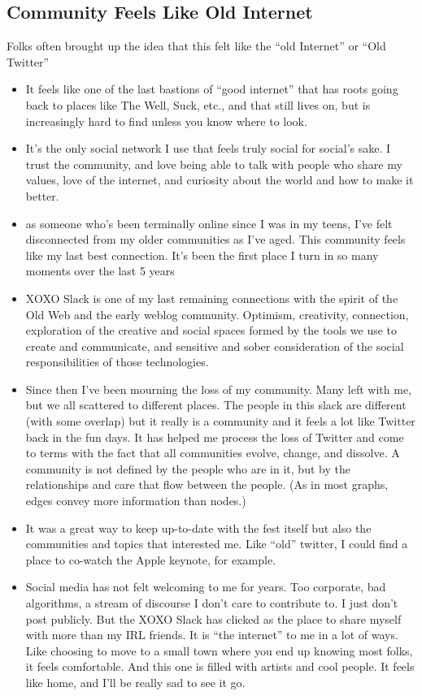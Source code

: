 \documentclass[
]{book}
\providecommand{\tightlist}{%
  \setlength{\itemsep}{0pt}\setlength{\parskip}{0pt}}
\begin{document}
\subsection{Community Feels Like Old Internet}\label{community-feels-like-old-internet}

Folks often brought up the idea that this felt like the ``old Internet'' or ``Old Twitter''

\begin{itemize}
\tightlist
\item
  It feels like one of the last bastions of ``good internet'' that has roots going back to places like The Well, Suck, etc., and that still lives on, but is increasingly hard to find unless you know where to look.
\item
  It's the only social network I use that feels truly social for social's sake. I trust the community, and love being able to talk with people who share my values, love of the internet, and curiosity about the world and how to make it better.
\item
  as someone who's been terminally online since I was in my teens, I've felt disconnected from my older communities as I've aged. This community feels like my last best connection. It's been the first place I turn in so many moments over the last 5 years
\item
  XOXO Slack is one of my last remaining connections with the spirit of the Old Web and the early weblog community. Optimism, creativity, connection, exploration of the creative and social spaces formed by the tools we use to create and communicate, and sensitive and sober consideration of the social responsibilities of those technologies.
\item
  Since then I've been mourning the loss of my community. Many left with me, but we all scattered to different places. The people in this slack are different (with some overlap) but it really is a community and it feels a lot like Twitter back in the fun days. It has helped me process the loss of Twitter and come to terms with the fact that all communities evolve, change, and dissolve. A community is not defined by the people who are in it, but by the relationships and care that flow between the people. (As in most graphs, edges convey more information than nodes.)
\item
  It was a great way to keep up-to-date with the fest itself but also the communities and topics that interested me. Like ``old'' twitter, I could find a place to co-watch the Apple keynote, for example.
\item
  Social media has not felt welcoming to me for years. Too corporate, bad algorithms, a stream of discourse I don't care to contribute to. I just don't post publicly. But the XOXO Slack has clicked as the place to share myself with more than my IRL friends. It is ``the internet'' to me in a lot of ways. Like choosing to move to a small town where you end up knowing most folks, it feels comfortable. And this one is filled with artists and cool people. It feels like home, and I'll be really sad to see it go.
\end{itemize}
\end{document}
